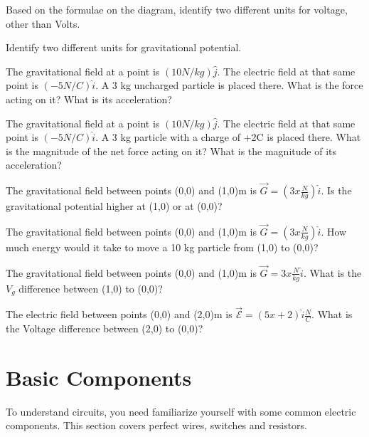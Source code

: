 \begin{alevel}
Based on the formulae on the diagram, identify two different units for voltage, other than Volts.
\end{alevel}

\begin{alevel}
Identify two different units for gravitational potential.
\end{alevel}

\begin{blevel}
The gravitational field at a point is $(10 N/kg) \hat{j}$. The electric field at that same point is $(-5 N/C) \hat{i}$. A 3 kg uncharged particle is placed there. What is the force acting on it? What is its acceleration?
\end{blevel}

\begin{blevel}
The gravitational field at a point is $(10 N/kg) \hat{j}$. The electric field at that same point is $(-5 N/C) \hat{i}$. A 3 kg particle with a charge of +2C is placed there. What is the magnitude of the net force acting on it? What is the magnitude of its acceleration?
\end{blevel}

\begin{blevel}
The gravitational field between points (0,0) and (1,0)m is $\vec{G}=(3x \frac{N}{kg})\hat{i}$. Is the gravitational potential higher at (1,0) or at (0,0)?
\end{blevel}

\begin{clevel}
The gravitational field between points (0,0) and (1,0)m is $\vec{G}=(3x \frac{N}{kg})\hat{i}$. How much energy would it take to move a 10 kg particle from (1,0) to (0,0)?
\end{clevel}

\begin{clevel}
The gravitational field between points (0,0) and (1,0)m is $\vec{G}=3x \frac{N}{kg}\hat{i}$. What is the $V_g$ difference between (1,0) to (0,0)?
\end{clevel}

\begin{clevel}
The electric field between points (0,0) and (2,0)m is $\vec{\mathcal{E}}=(5x+2)\hat{i} \frac{N}{C}$. What is the Voltage difference between (2,0) to (0,0)?
\end{clevel}

\section{Basic Components}
To understand circuits, you need familiarize yourself with some common electric components. This section covers perfect wires, switches and resistors.

